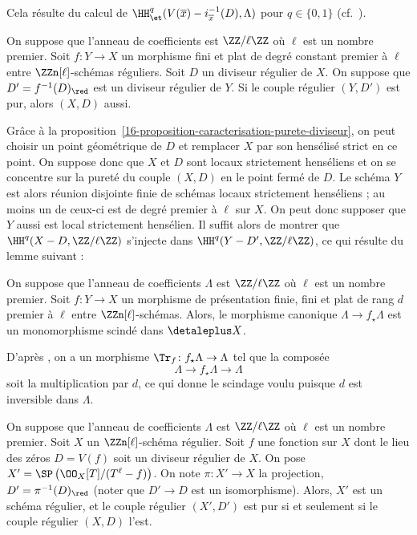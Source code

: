 \documentclass[10pt]{../fichiers-configuration-latex/smfart}
\begin{document}
Cela résulte du calcul de
$\HH^q_{\et}(V(\overline x)-i_{\overline x}^{-1}(D),\Lambda)$ pour
$q\in\{0,1\}$ (cf.~).

\bigskip

\begin{proposition2}\label{16-proposition-purete-argument-de-transfert-facile}
On suppose que l'anneau de coefficients est $\ZZ/\ell\ZZ$ où $\ell$ est un
nombre premier.
Soit $f\colon Y\to X$ un morphisme fini et plat de degré constant premier à
$\ell$ entre $\ZZn[\ell]$-schémas réguliers. Soit $D$ un diviseur régulier
de $X$. On suppose que $D'=f^{-1}(D)_{\red}$ est un diviseur régulier de
$Y$. Si le couple régulier $(Y,D')$ est pur, alors $(X,D)$ aussi.
\end{proposition2}

Grâce à la proposition~\ref{16-proposition-caracterisation-purete-diviseur},
on peut choisir un point géométrique de $D$ et remplacer $X$ par son
hensélisé strict en ce point. On suppose donc que $X$ et $D$ sont locaux
strictement henséliens et on se concentre sur la pureté du couple $(X,D)$
en le point fermé de $D$.
Le schéma $Y$ est
alors réunion disjointe finie de schémas locaux strictement henséliens ; au
moins un de ceux-ci est de degré premier à $\ell$ sur $X$. On peut donc
supposer que $Y$ aussi est local strictement hensélien.
Il suffit alors de montrer que $\HH^q(X-D,\ZZ/\ell\ZZ)$ s'injecte dans
$\HH^q(Y-D',\ZZ/\ell\ZZ)$, ce qui résulte du lemme suivant :

\begin{lemme2}
On suppose que l'anneau de coefficients $\Lambda$
est $\ZZ/\ell\ZZ$ où $\ell$ est un
nombre premier.
Soit $f\colon Y\to X$ un morphisme de présentation finie, fini et plat de
rang $d$ premier à $\ell$ entre $\ZZn[\ell]$-schémas.
Alors,
le morphisme canonique $\Lambda\to f_\star \Lambda$ est un monomorphisme
scindé dans $\detaleplus X$.
\end{lemme2}

D'après , on a un morphisme $\Tr_f\colon
f_\star\Lambda\to\Lambda$ tel que la composée
\[\Lambda\to f_\star\Lambda\to\Lambda\]
soit la multiplication par $d$, ce qui donne le scindage voulu puisque $d$
est inversible dans $\Lambda$.

\bigskip

\begin{proposition2}\label{16-proposition-up-and-down}
On suppose que l'anneau de coefficients $\Lambda$
est $\ZZ/\ell\ZZ$ où $\ell$ est un
nombre premier. Soit $X$ un $\ZZn[\ell]$-schéma régulier.
Soit $f$ une fonction sur $X$
dont le lieu des zéros $D=V(f)$ soit un diviseur régulier de $X$. On pose
$X'=\SP\left(\OO_X[T]/(T^\ell-f)\right)$. On note $\pi\colon X'\to X$ la projection,
$D'=\pi^{-1}(D)_{\red}$ (noter que $D'\to D$ est un isomorphisme). Alors,
$X'$ est un schéma régulier, et le couple régulier $(X',D')$ est pur si et
seulement si le couple régulier $(X,D)$ l'est.
\end{proposition2}
\end{document}
